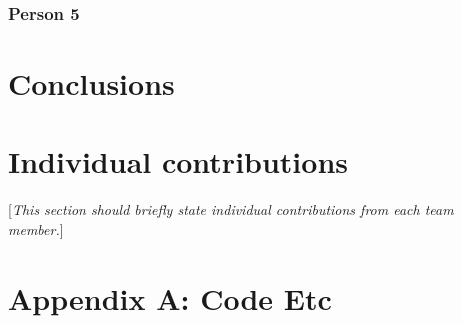 \documentclass[10pt,english, openany]{book}
\begin{document}
\subsection{Person 5}

\chapter{Conclusions}

\chapter{Individual contributions}
[\textit{This section should briefly state individual contributions from each team member.}]

\pagebreak





\pagebreak

\chapter*{Appendix A: Code Etc}
\end{document}
